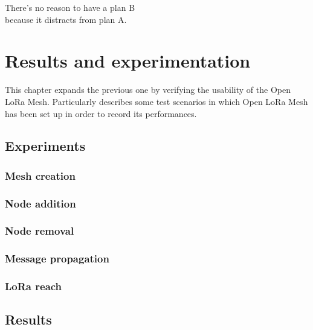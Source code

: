 
\begin{savequote}[60mm]
	There's no reason to have a plan B\\
	because it distracts from plan A.
\end{savequote}

\chapter{Results and experimentation}\label{chapter:results}
	
	This chapter expands the previous one by verifying the usability of the Open LoRa Mesh.
	Particularly describes some test scenarios in which Open LoRa Mesh has been set up in order to record its performances.
	
	\section{Experiments}
	
		\subsection{Mesh creation}
		
		\subsection{Node addition}

		\subsection{Node removal}
		
		\subsection{Message propagation}
		
		\subsection{LoRa reach}
	
	\section{Results}